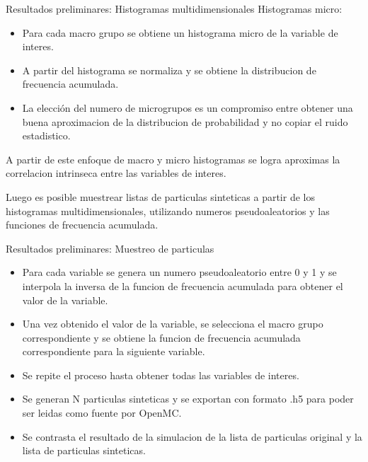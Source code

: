 \documentclass[aspectratio=169,english]{beamer}
\begin{document}
\begin{frame}[fragile]{Resultados preliminares: Histogramas multidimensionales}
    Histogramas micro:

    \begin{itemize}
        \item Para cada macro grupo se obtiene un histograma micro de la variable de interes.
        \item A partir del histograma se normaliza y se obtiene la distribucion de frecuencia acumulada.
        \item La elección del numero de microgrupos es un compromiso entre obtener una buena aproximacion de la distribucion de probabilidad y no copiar el ruido estadistico.
    \end{itemize}

    A partir de este enfoque de macro y micro histogramas se logra aproximas la correlacion intrinseca entre las variables de interes.

    Luego es posible muestrear listas de particulas sinteticas a partir de los histogramas multidimensionales, utilizando numeros pseudoaleatorios y las funciones de frecuencia acumulada.

     

\end{frame}

\begin{frame}{Resultados preliminares: Muestreo de particulas}
    \begin{itemize}
        \item Para cada variable se genera un numero pseudoaleatorio entre 0 y 1 y se interpola la inversa de la funcion de frecuencia acumulada para obtener el valor de la variable. 
        \item Una vez obtenido el valor de la variable, se selecciona el macro grupo correspondiente y se obtiene la funcion de frecuencia acumulada correspondiente para la siguiente variable.
        \item Se repite el proceso hasta obtener todas las variables de interes.
        \item Se generan N particulas sinteticas y se exportan con formato .h5 para poder ser leidas como fuente por OpenMC.
        \item Se contrasta el resultado de la simulacion de la lista de particulas original y la lista de particulas sinteticas.
    \end{itemize}

\end{frame}
\end{document}
